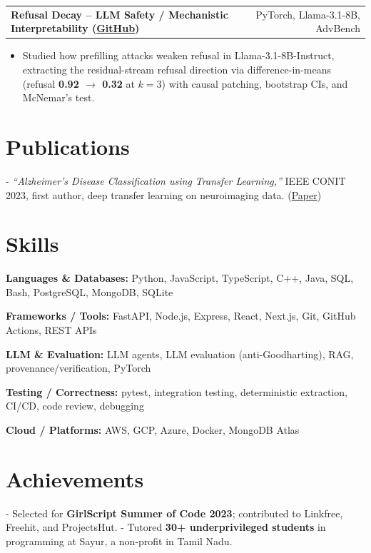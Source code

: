 \documentclass[letterpaper,11pt]{article}
\makeatletter
\newcommand{\projItem}[2]{%
  \vspace{6pt}
  \begin{tabular*}{\textwidth}{@{}l@{\extracolsep{\fill}}r@{}}
    \textbf{#1} & #2 \\
  \end{tabular*}\par\vspace{-2pt}
}
\newcommand{\skillLine}[2]{\textbf{#1:} #2\par\vspace{2pt}}
\newcommand{\inlineBlock}[1]{{\setlength{\leftskip}{0.18in}\small #1\par}}
\makeatother
\begin{document}
\projItem{Refusal Decay -- LLM Safety / Mechanistic Interpretability {\normalfont\small(\href{https://github.com/Deva-1903/refusal-decay}{GitHub})}}{PyTorch, Llama-3.1-8B, AdvBench}
\begin{itemize}
  \item Studied how prefilling attacks weaken refusal in Llama-3.1-8B-Instruct, extracting the residual-stream refusal direction via difference-in-means (refusal \textbf{0.92 $\to$ 0.32} at $k{=}3$) with causal patching, bootstrap CIs, and McNemar's test.
\end{itemize}

\section{Publications}
\inlineBlock{- \textit{``Alzheimer's Disease Classification using Transfer Learning,''} IEEE CONIT 2023, first author, deep transfer learning on neuroimaging data. {\normalfont\small(\href{https://ieeexplore.ieee.org/document/10205760}{Paper})}}

\section{Skills}
\skillLine{Languages \& Databases}{Python, JavaScript, TypeScript, C++, Java, SQL, Bash, PostgreSQL, MongoDB, SQLite}
\skillLine{Frameworks / Tools}{FastAPI, Node.js, Express, React, Next.js, Git, GitHub Actions, REST APIs}
\skillLine{LLM \& Evaluation}{LLM agents, LLM evaluation (anti-Goodharting), RAG, provenance/verification, PyTorch}
\skillLine{Testing / Correctness}{pytest, integration testing, deterministic extraction, CI/CD, code review, debugging}
\skillLine{Cloud / Platforms}{AWS, GCP, Azure, Docker, MongoDB Atlas}

\section{Achievements}
\inlineBlock{- Selected for \textbf{GirlScript Summer of Code 2023}; contributed to Linkfree, Freehit, and ProjectsHut. - Tutored \textbf{30+ underprivileged students} in programming at Sayur, a non-profit in Tamil Nadu.}
\end{document}
